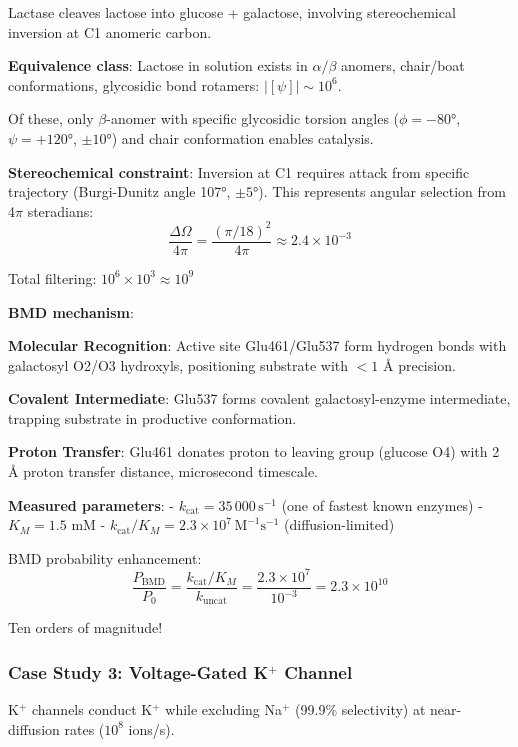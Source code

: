 \documentclass[11pt,onecolumn]{article}
\begin{document}
Lactase cleaves lactose into glucose + galactose, involving stereochemical inversion at C1 anomeric carbon.

\textbf{Equivalence class}: Lactose in solution exists in $\alpha/\beta$ anomers, chair/boat conformations, glycosidic bond rotamers: $|[\psi]| \sim 10^6$.

Of these, only $\beta$-anomer with specific glycosidic torsion angles ($\phi = -80°$, $\psi = +120°$, $\pm 10°$) and chair conformation enables catalysis.

\textbf{Stereochemical constraint}: Inversion at C1 requires attack from specific trajectory (Burgi-Dunitz angle 107°, $\pm 5°$). This represents angular selection from 4$\pi$ steradians:
\begin{equation}
\frac{\Delta\Omega}{4\pi} = \frac{(\pi/18)^2}{4\pi} \approx 2.4 \times 10^{-3}
\end{equation}

Total filtering: $10^6 \times 10^{3} \approx 10^9$

\textbf{BMD mechanism}:

\textbf{Molecular Recognition}: Active site Glu461/Glu537 form hydrogen bonds with galactosyl O2/O3 hydroxyls, positioning substrate with $<1$ Å precision.

\textbf{Covalent Intermediate}: Glu537 forms covalent galactosyl-enzyme intermediate, trapping substrate in productive conformation.

\textbf{Proton Transfer}: Glu461 donates proton to leaving group (glucose O4) with 2 Å proton transfer distance, microsecond timescale.

\textbf{Measured parameters}:
- $k_{\text{cat}} = 35\,000\,\text{s}^{-1}$ (one of fastest known enzymes)
- $K_M = 1.5$ mM
- $k_{\text{cat}}/K_M = 2.3 \times 10^7\,\text{M}^{-1}\text{s}^{-1}$ (diffusion-limited)

BMD probability enhancement:
\begin{equation}
\frac{P_{\text{BMD}}}{P_0} = \frac{k_{\text{cat}}/K_M}{k_{\text{uncat}}} = \frac{2.3 \times 10^7}{10^{-3}} = 2.3 \times 10^{10}
\end{equation}

Ten orders of magnitude!

\subsubsection{Case Study 3: Voltage-Gated K$^+$ Channel}

K$^+$ channels conduct K$^+$ while excluding Na$^+$ (99.9\% selectivity) at near-diffusion rates ($10^8$ ions/s).
\end{document}

